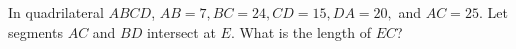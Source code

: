 In quadrilateral $ABCD$, $AB=7, BC=24, CD=15, DA=20,$ and $AC=25$. Let segments $AC$ and $BD$ intersect at $E$. What is the length of $EC$?

